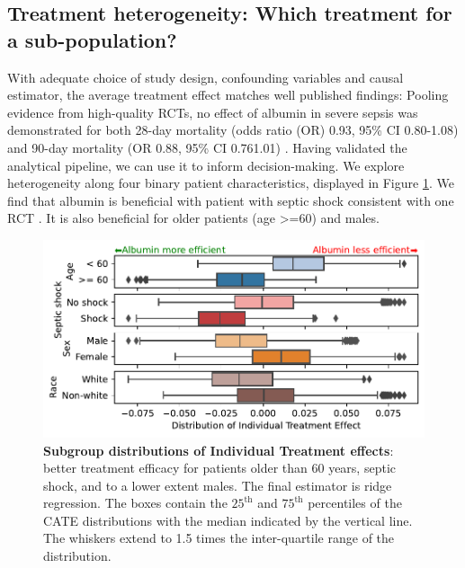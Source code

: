\documentclass[10pt,letterpaper]{article}
\begin{document}
\subsection*{Treatment heterogeneity: Which treatment for a sub-population?}%
\label{sec:treamtent_heterogeneity_mimic_iv}


With adequate choice of study design, confounding variables and causal
estimator, the average treatment effect matches well published findings:
Pooling evidence from high-quality RCTs, no effect of albumin in severe
sepsis was demonstrated for both 28-day mortality (odds ratio (OR) 0.93,
95\% CI 0.80-1.08) and 90-day mortality (OR 0.88, 95\% CI 0.761.01)
\cite{xu2014comparison}.
%
Having validated the analytical pipeline, we can use it to inform
decision-making. We explore
heterogeneity along four binary patient characteristics, displayed in Figure
\ref{fig:albumin_for_sepsis:cate_results}. We find that albumin is beneficial
with patient with septic shock consistent with one
RCT  \cite{caironi2014albumin}. It is also beneficial for older patients (age >=60) and males.

\begin{figure}[h!]
    \begin{minipage}{.4\linewidth}
        \caption{\textbf{Subgroup distributions of Individual Treatment
                effects}:
            better treatment efficacy for patients older than 60 years, septic shock,
            and to a lower extent males. The final estimator is ridge regression. The
            boxes contain the $25^\text{th}$ and $75^\text{th}$ percentiles of the CATE
            distributions with the median indicated by the vertical line. The whiskers
            extend to 1.5 times the inter-quartile range of the
            distribution.}\label{fig:albumin_for_sepsis:cate_results}
    \end{minipage}%
    \hfill%
    \begin{minipage}{.6\linewidth}
        \includegraphics[width=\linewidth]{img/boxplot_est__DML__nuisances__Forests__final_Ridge.pdf}
    \end{minipage}%
\end{figure}
\end{document}
